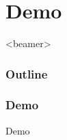 \documentclass[british,10pt]{beamer}
\begin{document}
%
%

\section{Demo}
\begin{frame}<beamer>\frametitle{Outline}
\end{frame}
  
\begin{frame}\frametitle{Demo}
\centering
\Huge Demo
\end{frame}
\end{document}
